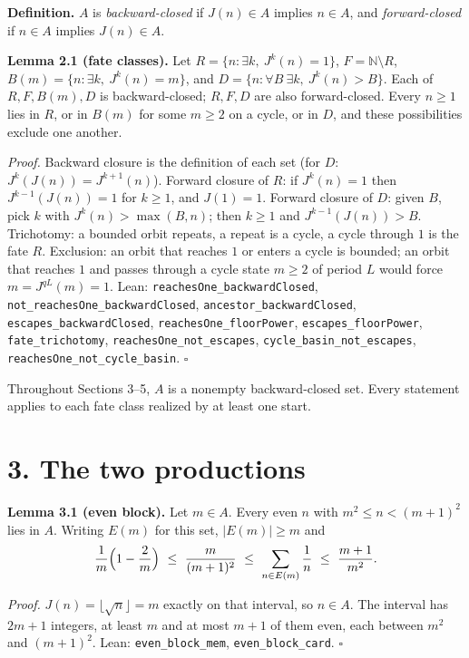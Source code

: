 \documentclass[11pt,a4paper]{article}
\begin{document}
\textbf{Definition.} \(A\) is \emph{backward-closed} if \(J(n)\in A\)
implies \(n\in A\), and \emph{forward-closed} if \(n\in A\) implies
\(J(n)\in A\).

\textbf{Lemma 2.1 (fate classes).} Let \(R=\{n:\exists k,\ J^k(n)=1\}\),
\(F=\mathbb N\setminus R\), \(B(m)=\{n:\exists k,\ J^k(n)=m\}\), and
\(D=\{n:\forall B\ \exists k,\ J^k(n)>B\}\). Each of \(R,F,B(m),D\) is
backward-closed; \(R,F,D\) are also forward-closed. Every \(n\ge 1\)
lies in \(R\), or in \(B(m)\) for some \(m\ge 2\) on a cycle, or in
\(D\), and these possibilities exclude one another.

\emph{Proof.} Backward closure is the definition of each set (for \(D\):
\(J^k(J(n))=J^{k+1}(n)\)). Forward closure of \(R\): if \(J^k(n)=1\)
then \(J^{k-1}(J(n))=1\) for \(k\ge 1\), and \(J(1)=1\). Forward closure
of \(D\): given \(B\), pick \(k\) with \(J^k(n)>\max(B,n)\); then
\(k\ge 1\) and \(J^{k-1}(J(n))>B\). Trichotomy: a bounded orbit repeats,
a repeat is a cycle, a cycle through \(1\) is the fate \(R\). Exclusion:
an orbit that reaches \(1\) or enters a cycle is bounded; an orbit that
reaches \(1\) and passes through a cycle state \(m\ge 2\) of period
\(L\) would force \(m=J^{qL}(m)=1\). Lean:
\texttt{\nolinkurl{reachesOne_backwardClosed}},
\texttt{\nolinkurl{not_reachesOne_backwardClosed}},
\texttt{\nolinkurl{ancestor_backwardClosed}},
\texttt{\nolinkurl{escapes_backwardClosed}},
\texttt{\nolinkurl{reachesOne_floorPower}},
\texttt{\nolinkurl{escapes_floorPower}},
\texttt{\nolinkurl{fate_trichotomy}},
\texttt{\nolinkurl{reachesOne_not_escapes}},
\texttt{\nolinkurl{cycle_basin_not_escapes}},
\texttt{\nolinkurl{reachesOne_not_cycle_basin}}. \(\square\)

Throughout Sections 3--5, \(A\) is a nonempty backward-closed set. Every
statement applies to each fate class realized by at least one start.

\section{3. The two productions}\label{the-two-productions}

\textbf{Lemma 3.1 (even block).} Let \(m\in A\). Every even \(n\) with
\(m^2\le n<(m+1)^2\) lies in \(A\). Writing \(E(m)\) for this set,
\(|E(m)|\ge m\) and \[
\frac1m\Bigl(1-\frac2m\Bigr)\ \le\ \frac{m}{(m+1)^2}\ \le\ \sum_{n\in E(m)}\frac1n\ \le\ \frac{m+1}{m^2}.
\]

\emph{Proof.} \(J(n)=\lfloor\sqrt n\rfloor=m\) exactly on that interval,
so \(n\in A\). The interval has \(2m+1\) integers, at least \(m\) and at
most \(m+1\) of them even, each between \(m^2\) and \((m+1)^2\). Lean:
\texttt{\nolinkurl{even_block_mem}},
\texttt{\nolinkurl{even_block_card}}. \(\square\)
\end{document}

